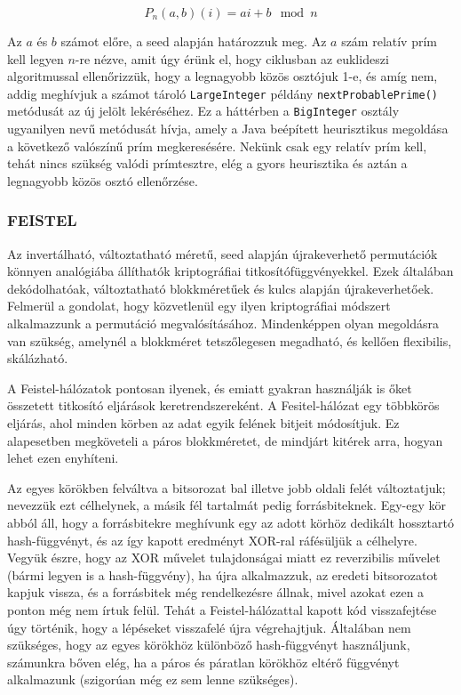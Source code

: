 \documentclass[
    parspace,
    noindent,
    nohyp,
]{elteiktdk}[2023/04/10]
\begin{document}
$$
P_n(a,b)(i) = ai + b \mod n
$$

Az $a$ és $b$ számot előre, a seed alapján határozzuk meg.
Az $a$ szám relatív prím kell legyen $n$-re nézve, amit úgy érünk el, hogy ciklusban az euklideszi algoritmussal ellenőrizzük, hogy a legnagyobb közös osztójuk 1-e,
és amíg nem, addig meghívjuk a számot tároló \texttt{LargeInteger} példány \texttt{nextProbablePrime()} metódusát az új jelölt lekéréséhez.
Ez a háttérben a \texttt{BigInteger} osztály ugyanilyen nevű metódusát hívja, amely a Java beépített heurisztikus megoldása a következő valószínű prím megkeresésére.
Nekünk csak egy relatív prím kell, tehát nincs szükség valódi prímtesztre, elég a gyors heurisztika és aztán a legnagyobb közös osztó ellenőrzése.

\subsubsection{FEISTEL}

Az invertálható, változtatható méretű, seed alapján újrakeverhető permutációk könnyen analógiába állíthatók kriptográfiai titkosítófüggvényekkel.
Ezek általában dekódolhatóak, változtatható blokkméretűek és kulcs alapján újrakeverhetőek.
Felmerül a gondolat, hogy közvetlenül egy ilyen kriptográfiai módszert alkalmazzunk a permutáció megvalósításához.
Mindenképpen olyan megoldásra van szükség, amelynél a blokkméret tetszőlegesen megadható, és kellően flexibilis, skálázható.

A Feistel-hálózatok pontosan ilyenek, és emiatt gyakran használják is őket összetett titkosító eljárások keretrendszereként.
A Fesitel-hálózat egy többkörös eljárás, ahol minden körben az adat egyik felének bitjeit módosítjuk.
Ez alapesetben megköveteli a páros blokkméretet, de mindjárt kitérek arra, hogyan lehet ezen enyhíteni.

Az egyes körökben felváltva a bitsorozat bal illetve jobb oldali felét változtatjuk; nevezzük ezt célhelynek, a másik fél tartalmát pedig forrásbiteknek.
Egy-egy kör abból áll, hogy a forrásbitekre meghívunk egy az adott körhöz dedikált hossztartó hash-függvényt,
és az így kapott eredményt XOR-ral ráfésüljük a célhelyre.
Vegyük észre, hogy az XOR művelet tulajdonságai miatt ez reverzibilis művelet (bármi legyen is a hash-függvény),
ha újra alkalmazzuk, az eredeti bitsorozatot kapjuk vissza,
és a forrásbitek még rendelkezésre állnak, mivel azokat ezen a ponton még nem írtuk felül.
Tehát a Feistel-hálózattal kapott kód visszafejtése úgy történik, hogy a lépéseket visszafelé újra végrehajtjuk.
Általában nem szükséges, hogy az egyes körökhöz különböző hash-függvényt használjunk,
számunkra bőven elég, ha a páros és páratlan körökhöz eltérő függvényt alkalmazunk (szigorúan még ez sem lenne szükséges).
\end{document}
